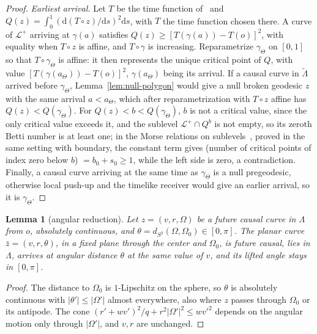 \documentclass[aip,jmp,amsmath,amssymb,reprint]{revtex4-2}
\newcommand{\dd}{\mathrm{d}}
\theoremstyle{plain}
\newtheorem{lemma}[proposition]{Lemma}
\theoremstyle{definition}
\begin{document}
\begin{proof}
\emph{Earliest arrival.} Let $T$ be the time function of~\cite{GiannoniMasielloPiccioneMorse} and
$Q(z)=\int_0^1(\dd(T\circ z)/\dd s)^2\dd s$, with $T$ the time function chosen there. A curve of $\mathcal L^+$ arriving at
$\gamma(a)$ satisfies $Q(z)\ge[T(\gamma(a))-T(o)]^2$, with equality when $T\circ z$ is affine, and $T\circ\gamma$ is
increasing. Reparametrize $\gamma_\Theta$ on $[0,1]$ so that $T\circ\gamma_\Theta$ is affine: it then represents the unique
critical point of $Q$, with value $[T(\gamma(a_\Theta))-T(o)]^2$, $\gamma(a_\Theta)$ being its arrival. If a causal curve
in $\tilde\Lambda$ arrived before $\gamma_\Theta$, Lemma~\ref{lem:null-polygon} would give a null broken geodesic $z$ with the
same arrival $a<a_\Theta$, which after reparametrization with $T\circ z$ affine has $Q(z)<Q(\gamma_\Theta)$. For
$Q(z)<b<Q(\gamma_\Theta)$, $b$ is not a critical value, since the only critical value exceeds it, and the sublevel
$\mathcal L^+\cap Q^b$ is not empty, so its zeroth Betti number is at least one; in the Morse relations on
sublevels~\cite[Theorem~7.1]{GiannoniMasielloPiccioneMorse}, proved in the same setting with boundary, the
constant term gives (number of critical points of index zero below $b$) $=b_0+s_0\ge1$, while the left
side is zero, a contradiction. Finally, a causal curve arriving at the same time as $\gamma_\Theta$ is a null pregeodesic,
otherwise local push-up and the timelike receiver would give an earlier arrival, so it is $\gamma_\Theta$.
\end{proof}

\begin{lemma}[angular reduction]\label{lem:vaidya-reduction}
Let $z=(v,r,\Omega)$ be a future causal curve in $\Lambda$ from $o$, absolutely continuous, and
$\theta=d_{S^2}(\Omega,\Omega_0)\in[0,\pi]$. The planar curve $\bar z=(v,r,\theta)$, in a fixed plane through the center and
$\Omega_0$, is future causal, lies in $\Lambda$, arrives at angular distance $\theta$ at the same value of $v$, and its
lifted angle stays in $[0,\pi]$.
\end{lemma}

\begin{proof}
The distance to $\Omega_0$ is $1$-Lipschitz on the sphere, so $\theta$ is absolutely continuous with
$|\theta'|\le|\Omega'|$ almost everywhere, also where $z$ passes through $\Omega_0$ or its antipode. The cone
$(r'+wv')^2/q+r^2|\Omega'|^2\le wv'^2$ depends on the angular motion only through $|\Omega'|$, and $v,r$ are
unchanged.
\end{proof}
\end{document}
